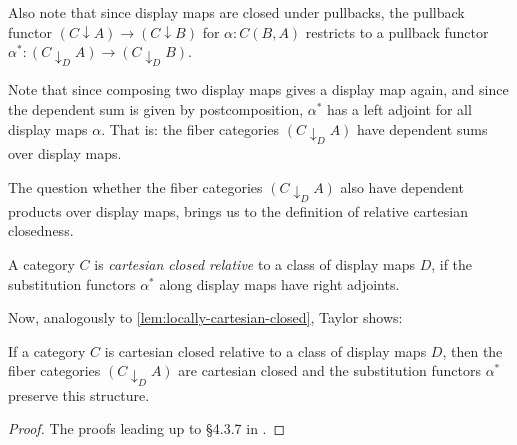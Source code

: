 Also note that since display maps are closed under pullbacks, the pullback functor $ (C \downarrow A) \to (C \downarrow B) $ for $ \alpha: C(B, A) $ restricts to a pullback functor $ \alpha^*: (C \downarrow_D A) \to (C \downarrow_D B) $.

Note that since composing two display maps gives a display map again, and since the dependent sum is given by postcomposition, $ \alpha^* $ has a left adjoint for all display maps $ \alpha $. That is: the fiber categories $ (C \downarrow_D A) $ have dependent sums over display maps.

The question whether the fiber categories $ (C \downarrow_D A) $ also have dependent products over display maps, brings us to the definition of relative cartesian closedness.
\begin{definition}
  A category $ C $ is \textit{cartesian closed relative} to a class of display maps $ D $, if the substitution functors $ \alpha^* $ along display maps have right adjoints.
\end{definition}

Now, analogously to \ref{lem:locally-cartesian-closed}, Taylor shows:
\begin{lemma}
  If a category $ C $ is cartesian closed relative to a class of display maps $ D $, then the fiber categories $ (C \downarrow_D A) $ are cartesian closed and the substitution functors $ \alpha^* $ preserve this structure.
\end{lemma}
\begin{proof}
  The proofs leading up to \S 4.3.7 in \cite{taylor}.
\end{proof}
